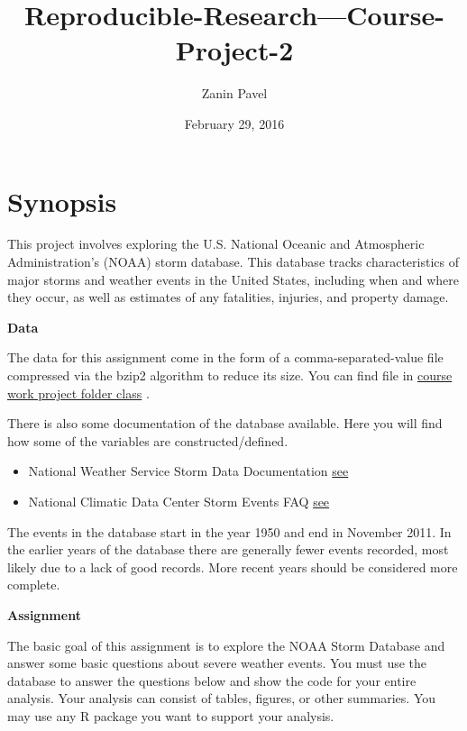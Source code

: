 \documentclass[]{article}
\title{Reproducible-Research---Course-Project-2}
\author{Zanin Pavel}
\date{February 29, 2016}
\begin{document}
\maketitle


\section{Synopsis}\label{synopsis}

This project involves exploring the U.S. National Oceanic and
Atmospheric Administration's (NOAA) storm database. This database tracks
characteristics of major storms and weather events in the United States,
including when and where they occur, as well as estimates of any
fatalities, injuries, and property damage.

\textbf{Data}

The data for this assignment come in the form of a comma-separated-value
file compressed via the bzip2 algorithm to reduce its size. You can find
file in
\href{https://github.com/Filareth2015/Reproducible-Research---Course-Project-2}{course
work project folder class} .

There is also some documentation of the database available. Here you
will find how some of the variables are constructed/defined.

\begin{itemize}
\itemsep1pt\parskip0pt
\item
  National Weather Service Storm Data Documentation
  \href{https://github.com/Filareth2015/Reproducible-Research---Course-Project-2}{see}\\
\item
  National Climatic Data Center Storm Events FAQ
  \href{https://github.com/Filareth2015/Reproducible-Research---Course-Project-2}{see}
\end{itemize}

The events in the database start in the year 1950 and end in November
2011. In the earlier years of the database there are generally fewer
events recorded, most likely due to a lack of good records. More recent
years should be considered more complete.

\textbf{Assignment}

The basic goal of this assignment is to explore the NOAA Storm Database
and answer some basic questions about severe weather events. You must
use the database to answer the questions below and show the code for
your entire analysis. Your analysis can consist of tables, figures, or
other summaries. You may use any R package you want to support your
analysis.
\end{document}
